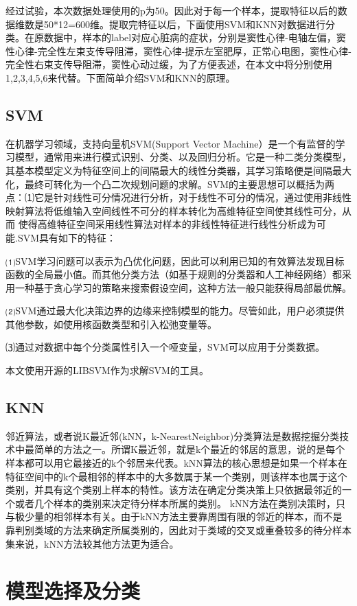 \documentclass[12pt]{elsarticle}
\begin{document}
经过试验，本次数据处理使用的p为50。因此对于每一个样本，提取特征以后的数据维数是50*12=600维。提取完特征以后，下面使用SVM和KNN对数据进行分类。在原数据中，样本的label对应心脏病的症状，分别是窦性心律-电轴左偏，窦性心律-完全性左束支传导阻滞，窦性心律-提示左室肥厚，正常心电图，窦性心律-完全性右束支传导阻滞，窦性心动过缓，为了方便表述，在本文中将分别使用1,2,3,4,5,6来代替。下面简单介绍SVM和KNN的原理。

\subsection{SVM}
在机器学习领域，支持向量机SVM(Support Vector Machine）是一个有监督的学习模型，通常用来进行模式识别、分类、以及回归分析。它是一种二类分类模型，其基本模型定义为特征空间上的间隔最大的线性分类器，其学习策略便是间隔最大化，最终可转化为一个凸二次规划问题的求解。SVM的主要思想可以概括为两点：⑴它是针对线性可分情况进行分析，对于线性不可分的情况，通过使用非线性映射算法将低维输入空间线性不可分的样本转化为高维特征空间使其线性可分，从而 使得高维特征空间采用线性算法对样本的非线性特征进行线性分析成为可能.SVM具有如下的特征：

⑴SVM学习问题可以表示为凸优化问题，因此可以利用已知的有效算法发现目标函数的全局最小值。而其他分类方法（如基于规则的分类器和人工神经网络）都采用一种基于贪心学习的策略来搜索假设空间，这种方法一般只能获得局部最优解。

⑵SVM通过最大化决策边界的边缘来控制模型的能力。尽管如此，用户必须提供其他参数，如使用核函数类型和引入松弛变量等。

⑶通过对数据中每个分类属性引入一个哑变量，SVM可以应用于分类数据。

本文使用开源的LIBSVM作为求解SVM的工具。
\subsection{KNN}
邻近算法，或者说K最近邻(kNN，k-NearestNeighbor)分类算法是数据挖掘分类技术中最简单的方法之一。所谓K最近邻，就是k个最近的邻居的意思，说的是每个样本都可以用它最接近的k个邻居来代表。kNN算法的核心思想是如果一个样本在特征空间中的k个最相邻的样本中的大多数属于某一个类别，则该样本也属于这个类别，并具有这个类别上样本的特性。该方法在确定分类决策上只依据最邻近的一个或者几个样本的类别来决定待分样本所属的类别。 kNN方法在类别决策时，只与极少量的相邻样本有关。由于kNN方法主要靠周围有限的邻近的样本，而不是靠判别类域的方法来确定所属类别的，因此对于类域的交叉或重叠较多的待分样本集来说，kNN方法较其他方法更为适合。

\section{模型选择及分类}
\end{document}
